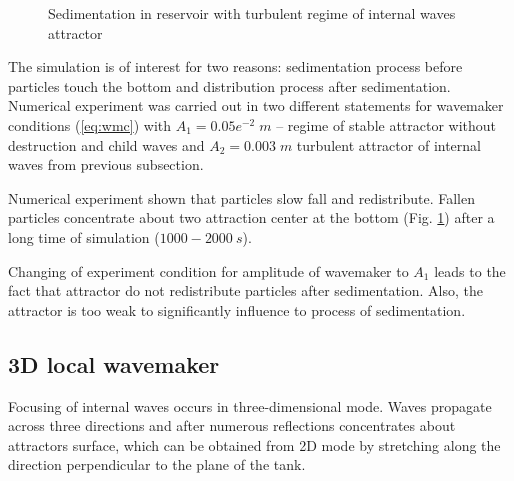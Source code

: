 \documentclass[a4wide,fontsize=12pt]{article}
\begin{document}
\begin{figure}[h!]
\centering
    \begin{minipage}[t]{0.45\textwidth}
        \centering
        \label{fig:turbSed2Da}
    \end{minipage}
    \begin{minipage}[t]{0.45\textwidth}
        \centering
        \label{fig:turbSed2Db}
    \end{minipage}
    \caption{Sedimentation in reservoir with turbulent regime of internal waves attractor}
    \label{fig:turbSed}
\end{figure}

The simulation is of interest for two reasons: sedimentation process before particles touch the bottom and distribution process after sedimentation. Numerical experiment was carried out in two different statements for wavemaker conditions (\ref{eq:wmc}) with $A_1=0.05e^{-2}\;m$ -- regime of stable attractor without destruction and child waves and $A_2=0.003\;m$ turbulent attractor of internal waves from previous subsection. 


Numerical experiment shown that particles slow fall and redistribute. Fallen particles concentrate about two attraction center at the bottom (Fig. \ref{fig:turbSed}) after a long time of simulation ($1000-2000\ s$).

Changing of experiment condition for amplitude of wavemaker to $A_1$ leads to the fact that attractor do not redistribute particles after sedimentation. Also, the attractor is too weak to significantly influence to process of sedimentation.



\subsection{3D local wavemaker}

Focusing of internal waves occurs in three-dimensional mode. Waves propagate across three directions and after numerous reflections concentrates about attractors surface, which can be obtained from 2D mode by stretching along the direction perpendicular to the plane of the tank. 
\end{document}
